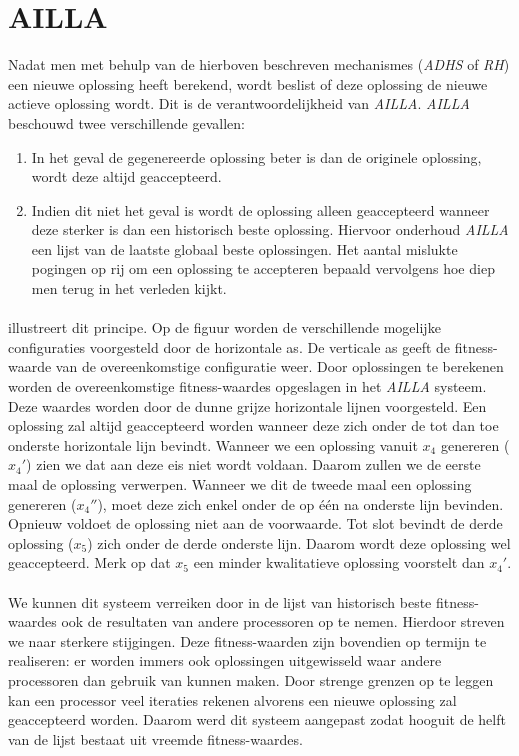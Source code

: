 \section{AILLA}

Nadat men met behulp van de hierboven beschreven mechanismes (\emph{ADHS} of \emph{RH}) een nieuwe oplossing heeft berekend, wordt beslist of deze oplossing de nieuwe actieve oplossing wordt. Dit is de verantwoordelijkheid van \emph{AILLA}. \emph{AILLA} beschouwd twee verschillende gevallen:
\begin{enumerate}
 \item In het geval de gegenereerde oplossing beter is dan de originele oplossing, wordt deze altijd geaccepteerd.
 \item Indien dit niet het geval is wordt de oplossing alleen geaccepteerd wanneer deze sterker is dan een historisch beste oplossing. Hiervoor onderhoud \emph{AILLA} een lijst van de laatste globaal beste oplossingen. Het aantal mislukte pogingen op rij om een oplossing te accepteren bepaald vervolgens hoe diep men terug in het verleden kijkt.
\end{enumerate}

\paragraph{}
 illustreert dit principe. Op de figuur worden de verschillende mogelijke configuraties voorgesteld door de horizontale as. De verticale as geeft de fitness-waarde van de overeenkomstige configuratie weer. Door oplossingen te berekenen worden de overeenkomstige fitness-waardes opgeslagen in het \emph{AILLA} systeem. Deze waardes worden door de dunne grijze horizontale lijnen voorgesteld. Een oplossing zal altijd geaccepteerd worden wanneer deze zich onder de tot dan toe onderste horizontale lijn bevindt. Wanneer we een oplossing vanuit $x_4$ genereren ($x_4'$) zien we dat aan deze eis niet wordt voldaan. Daarom zullen we de eerste maal de oplossing verwerpen. Wanneer we dit de tweede maal een oplossing genereren ($x_4''$), moet deze zich enkel onder de op \'e\'en na onderste lijn bevinden. Opnieuw voldoet de oplossing niet aan de voorwaarde. Tot slot bevindt de derde oplossing ($x_5$) zich onder de derde onderste lijn. Daarom wordt deze oplossing wel geaccepteerd. Merk op dat $x_5$ een minder kwalitatieve oplossing voorstelt dan $x_4'$.

\paragraph{}
We kunnen dit systeem verreiken door in de lijst van historisch beste fitness-waardes ook de resultaten van andere processoren op te nemen. Hierdoor streven we naar sterkere stijgingen. Deze fitness-waarden zijn bovendien op termijn te realiseren: er worden immers ook oplossingen uitgewisseld waar andere processoren dan gebruik van kunnen maken. Door strenge grenzen op te leggen kan een processor veel iteraties rekenen alvorens een nieuwe oplossing zal geaccepteerd worden. Daarom werd dit systeem aangepast zodat hooguit de helft van de lijst bestaat uit vreemde fitness-waardes.